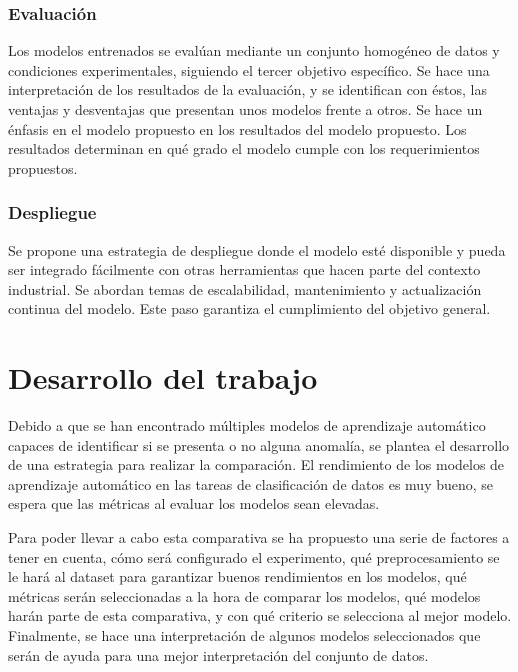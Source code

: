 \documentclass[11pt,a4paper,spanish]{book}
\numberwithin{equation}{chapter}
\numberwithin{figure}{chapter}
\begin{document}
\subsection{Evaluación}

Los modelos entrenados se evalúan mediante un conjunto homogéneo de datos y condiciones 
experimentales, siguiendo el tercer objetivo específico. Se hace una interpretación de 
los resultados de la evaluación, y se identifican con éstos, las ventajas y desventajas 
que presentan unos modelos frente a otros. 
Se hace un énfasis en el modelo propuesto en los resultados del modelo propuesto. 
Los resultados determinan en qué grado el modelo cumple con los requerimientos propuestos. 

\subsection{Despliegue}

Se propone una estrategia de despliegue donde el modelo esté disponible y pueda ser 
integrado fácilmente con otras herramientas que hacen parte del contexto industrial. 
Se abordan temas de escalabilidad, mantenimiento y actualización continua del modelo. 
Este paso garantiza el cumplimiento del objetivo general. 



\chapter{Desarrollo del trabajo}

Debido a que se han encontrado múltiples modelos de aprendizaje automático capaces de 
identificar si se presenta o no alguna anomalía, se plantea el desarrollo de una 
estrategia para realizar la comparación. El rendimiento de los modelos de aprendizaje 
automático en las tareas de clasificación de datos es muy bueno, se espera que las 
métricas al evaluar los modelos sean elevadas. 


Para poder llevar a cabo esta comparativa se ha propuesto una serie de factores a tener 
en cuenta, cómo será configurado el experimento, qué preprocesamiento se le hará al 
dataset para garantizar buenos rendimientos en los modelos, qué métricas serán 
seleccionadas a la hora de comparar los modelos, qué modelos harán parte de esta 
comparativa, y con qué criterio se selecciona al mejor modelo. Finalmente, se hace una 
interpretación de algunos modelos seleccionados que serán de ayuda para una mejor 
interpretación del conjunto de datos. 
\end{document}
